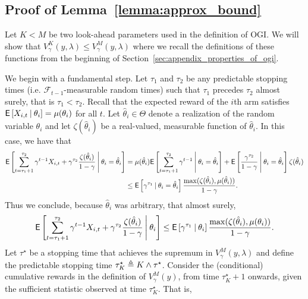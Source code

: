 \subsection{Proof of Lemma~\ref{lemma:approx_bound}} \label{prf:approx_bound}
\begin{myproof}[Proof.]
	Let $K < M$ be two look-ahead parameters used in the definition of OGI. We will show that $V^K_\gamma(y, \lambda) \le V^M_\gamma(y, \lambda)$ where we recall the definitions of these functions from the beginning of Section~\ref{sec:appendix_properties_of_ogi}.
	
	We begin with a fundamental step. Let $\tau_1$ and $\tau_2$ be any predictable stopping times (i.e. $\mathcal F_{t-1}$-measurable random times) such that $\tau_1$ precedes $\tau_2$ almost surely, that is $\tau_1 < \tau_2$. Recall that the expected reward of the $i$th arm satisfies $\Ee{X_{i,t} \given \theta_i} = \mu(\theta_i)$ for all $t$. Let $\hat \theta_i \in \Theta$ denote a realization of the random variable $\theta_i$ and let $\zeta(\hat \theta_i)$ be a real-valued, measurable function of $\hat \theta_i$. In this case, we have that
	\begin{align*}
	\Ee{\sum_{t=\tau_1+1}^{\tau_2} \gamma^{t-1} X_{i,t} + \gamma^{\tau_2}\frac{\zeta(\hat \theta_i)}{1 - \gamma} \given[\Bigg] \theta_i = \hat \theta_i} & =\mu(\hat \theta_i) \Ee{ \sum_{t=\tau_1+1}^{\tau_2} \gamma^{t-1}  \given[\Bigg] \theta_i = \hat \theta_i} + \Ee{\frac{\gamma^{\tau_2}}{1-\gamma}\given[\Bigg] \theta_i = \hat \theta_i}\zeta(\hat \theta_i) \\
	& \le \Ee{\gamma^{\tau_1} \given \theta_i = \hat \theta_i}  \frac{\max(\zeta(\hat \theta_i), \mu(\hat \theta_i))}{1-\gamma}.
	\end{align*}
	Thus we conclude, because $\hat \theta_i$ was arbitrary, that almost surely,
	\begin{equation} \label{ineq:fundamntal_bound_for_lemma_2}
	\Ee{\sum_{t=\tau_1+1}^{\tau_2} \gamma^{t-1} X_{i,t} + \gamma^{\tau_2}\frac{\zeta(\hat \theta_i)}{1 - \gamma} \given[\Bigg] \theta_i}  \le \Ee{\gamma^{\tau_1} \given \theta_i }  \frac{\max(\zeta(\hat \theta_i), \mu(\theta_i))}{1-\gamma}.
	\end{equation}
	Let $\tau^\star$ be a stopping time that achieves the supremum in  $V_\gamma^M(y, \lambda)$ and define the predictable stopping time $\tau^\star_K \defeq K \wedge \tau^\star$. Consider the (conditional) cumulative rewards in the definition of $V^M_\gamma(y)$, from time $\tau^\star_K+1$ onwards, given the sufficient statistic observed at time $\tau_K^\star$. That is, 

\end{myproof}
